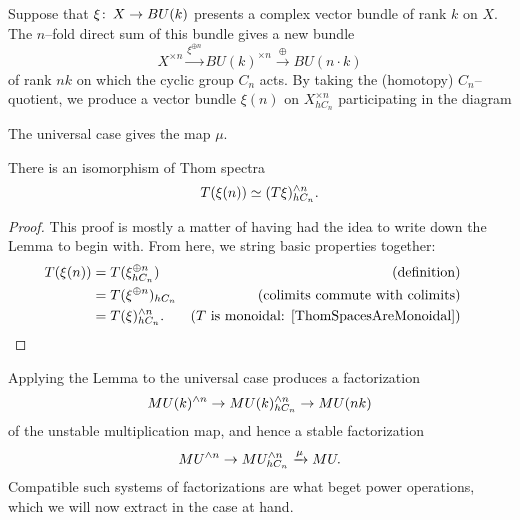 \begin{definition}
Suppose that $\xi\colon\thinspace X \to BU(k)$ presents a complex vector bundle of rank $k$ on $X$.  The $n$--fold direct sum of this bundle gives a new bundle \[X^{\times n} \xrightarrow{\xi^{\oplus n}} BU(k)^{\times n} \xrightarrow{\oplus} BU(n \cdot k)\] of rank $nk$ on which the cyclic group $C_n$ acts.  By taking the (homotopy) $C_n$--quotient, we produce a vector bundle $\xi(n)$ on $X^{\times n}_{hC_n}$ participating in the diagram
\begin{center}
\end{center}
The universal case gives the map $\mu$.
\end{definition}

\begin{lemma}
There is an isomorphism of Thom spectra \[T(\xi(n)) \simeq (T\xi)^{\wedge n}_{hC_n}.\]
\end{lemma}
\begin{proof}
This proof is mostly a matter of having had the idea to write down the Lemma to begin with.  From here, we string basic properties together:
\begin{align*}
T(\xi(n)) & = T(\xi^{\oplus n}_{hC_n}) & \text{(definition)} \\
& = T(\xi^{\oplus n})_{hC_n} & \text{(colimits commute with colimits)} \\
& = T(\xi)^{\sm n}_{hC_n}. & \text{($T$ is monoidal: \Cref{ThomSpacesAreMonoidal})} & \qedhere
\end{align*}
\end{proof}

Applying the Lemma to the universal case produces a factorization \[MU(k)^{\wedge n} \to MU(k)^{\wedge n}_{hC_n} \to MU(nk)\] of the unstable multiplication map, and hence a stable factorization \[MU^{\wedge n} \to MU^{\wedge n}_{hC_n} \xrightarrow{\mu} MU.\]  Compatible such systems of factorizations are what beget power operations, which we will now extract in the case at hand.

